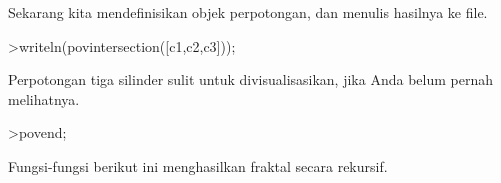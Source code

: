 \documentclass[a4paper,10pt]{article}
\begin{document}
\begin{eulernotebook}
\begin{eulercomment}
\begin{eulercomment}
\begin{eulercomment}
\begin{eulercomment}
\begin{eulercomment}
\begin{eulercomment}
\begin{eulercomment}
\begin{eulercomment}
\begin{eulercomment}
\begin{eulercomment}
\begin{eulercomment}
\begin{eulercomment}
\begin{eulercomment}
\begin{eulercomment}
\begin{eulercomment}
\begin{eulercomment}
\begin{euleroutput}
\end{euleroutput}
\begin{eulercomment}
Sekarang kita mendefinisikan objek perpotongan, dan menulis hasilnya
ke file.
\end{eulercomment}
\begin{eulerprompt}
>writeln(povintersection([c1,c2,c3]));
\end{eulerprompt}
\begin{eulercomment}
Perpotongan tiga silinder sulit untuk divisualisasikan, jika Anda
belum pernah melihatnya.
\end{eulercomment}
\begin{eulerprompt}
>povend;
\end{eulerprompt}
\begin{eulercomment}
Fungsi-fungsi berikut ini menghasilkan fraktal secara rekursif.


\end{eulercomment}
\end{eulercomment}
\end{eulercomment}
\end{eulercomment}
\end{eulercomment}
\end{eulercomment}
\end{eulercomment}
\end{eulercomment}
\end{eulercomment}
\end{eulercomment}
\end{eulercomment}
\end{eulercomment}
\end{eulercomment}
\end{eulercomment}
\end{eulercomment}
\end{eulercomment}
\end{eulercomment}
\end{eulernotebook}
\end{document}
